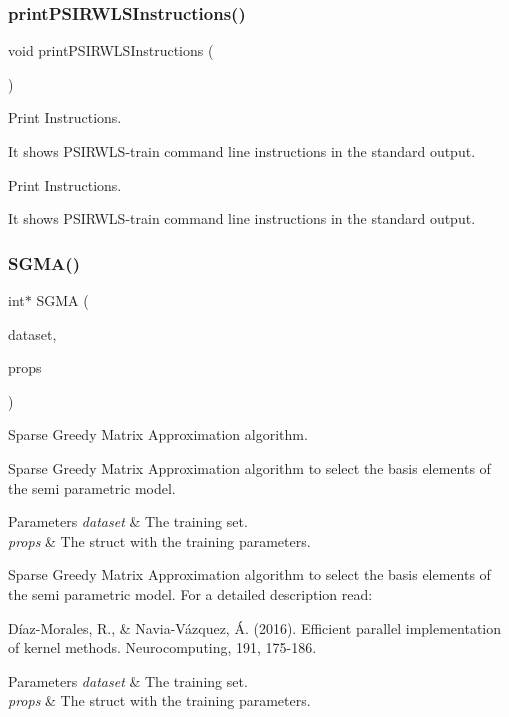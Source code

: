\subsubsection{\texorpdfstring{print\+P\+S\+I\+R\+W\+L\+S\+Instructions()}{printPSIRWLSInstructions()}}
{\ttfamily void print\+P\+S\+I\+R\+W\+L\+S\+Instructions (\begin{DoxyParamCaption}{ }\end{DoxyParamCaption})}



Print Instructions. 

It shows P\+S\+I\+R\+W\+L\+S-\/train command line instructions in the standard output.

Print Instructions.

It shows P\+S\+I\+R\+W\+L\+S-\/train command line instructions in the standard output. \hypertarget{PSIRWLS-train_8h_a50a6e1f36a010feb91db9b9b38679948}{}\label{PSIRWLS-train_8h_a50a6e1f36a010feb91db9b9b38679948} 
\subsubsection{\texorpdfstring{S\+G\+M\+A()}{SGMA()}}
{\ttfamily int$\ast$ S\+G\+MA (\begin{DoxyParamCaption}\item[{\hyperlink{structsvm__dataset}{svm\+\_\+dataset}}]{dataset,  }\item[{\hyperlink{structproperties}{properties}}]{props }\end{DoxyParamCaption})}



Sparse Greedy Matrix Approximation algorithm. 

Sparse Greedy Matrix Approximation algorithm to select the basis elements of the semi parametric model. 
\begin{DoxyParams}{Parameters}
{\em dataset} & The training set. \\
\hline
{\em props} & The struct with the training parameters.\\
\hline
\end{DoxyParams}
Sparse Greedy Matrix Approximation algorithm to select the basis elements of the semi parametric model. For a detailed description read\+:

Díaz-\/\+Morales, R., \& Navia-\/\+Vázquez, Á. (2016). Efficient parallel implementation of kernel methods. Neurocomputing, 191, 175-\/186.


\begin{DoxyParams}{Parameters}
{\em dataset} & The training set. \\
\hline
{\em props} & The struct with the training parameters. \\
\hline
\end{DoxyParams}
